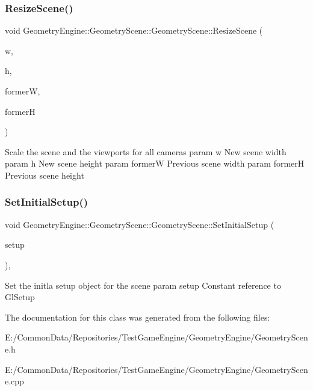 \subsubsection{\texorpdfstring{ResizeScene()}{ResizeScene()}}
{\footnotesize\ttfamily void Geometry\+Engine\+::\+Geometry\+Scene\+::\+Geometry\+Scene\+::\+Resize\+Scene (\begin{DoxyParamCaption}\item[{int}]{w,  }\item[{int}]{h,  }\item[{int}]{formerW,  }\item[{int}]{formerH }\end{DoxyParamCaption})\hspace{0.3cm}{\ttfamily [virtual]}}

Scale the scene and the viewports for all cameras param w New scene width param h New scene height param formerW Previous scene width param formerH Previous scene height \mbox{\label{class_geometry_engine_1_1_geometry_scene_1_1_geometry_scene_aaef4d7c17ec0292604c3d0cbb861b980}} 
\subsubsection{\texorpdfstring{SetInitialSetup()}{SetInitialSetup()}}
{\footnotesize\ttfamily void Geometry\+Engine\+::\+Geometry\+Scene\+::\+Geometry\+Scene\+::\+Set\+Initial\+Setup (\begin{DoxyParamCaption}\item[{const \mbox{\hyperlink{class_geometry_engine_1_1_geometry_gl_setup_1_1_gl_setup}{Geometry\+Gl\+Setup\+::\+Gl\+Setup}} \&}]{setup }\end{DoxyParamCaption})\hspace{0.3cm}{\ttfamily [inline]}, {\ttfamily [virtual]}}

Set the initla setup object for the scene param setup Constant reference to Gl\+Setup 

The documentation for this class was generated from the following files\+:\begin{DoxyCompactItemize}
\item 
E\+:/\+Common\+Data/\+Repositories/\+Test\+Game\+Engine/\+Geometry\+Engine/Geometry\+Scene.\+h\item 
E\+:/\+Common\+Data/\+Repositories/\+Test\+Game\+Engine/\+Geometry\+Engine/Geometry\+Scene.\+cpp\end{DoxyCompactItemize}
